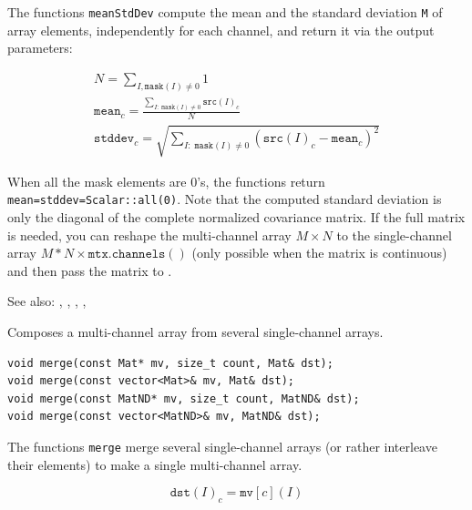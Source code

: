 The functions \texttt{meanStdDev} compute the mean and the standard deviation \texttt{M} of array elements, independently for each channel, and return it via the output parameters:

\[
\begin{array}{l}
N = \sum_{I, \texttt{mask}(I) \ne 0} 1\\
\texttt{mean}_c = \frac{\sum_{ I: \; \texttt{mask}(I) \ne 0} \texttt{src}(I)_c}{N}\\
\texttt{stddev}_c = \sqrt{\sum_{ I: \; \texttt{mask}(I) \ne 0} \left(\texttt{src}(I)_c - \texttt{mean}_c\right)^2}
\end{array}
\]

When all the mask elements are 0's, the functions return \texttt{mean=stddev=Scalar::all(0)}.
Note that the computed standard deviation is only the diagonal of the complete normalized covariance matrix. If the full matrix is needed, you can reshape the multi-channel array $M \times N$ to the single-channel array $M*N \times \texttt{mtx.channels}()$ (only possible when the matrix is continuous) and then pass the matrix to .

See also: , , , , 


\label{merge}
Composes a multi-channel array from several single-channel arrays.

\begin{lstlisting}
void merge(const Mat* mv, size_t count, Mat& dst);
void merge(const vector<Mat>& mv, Mat& dst);
void merge(const MatND* mv, size_t count, MatND& dst);
void merge(const vector<MatND>& mv, MatND& dst);
\end{lstlisting}
\begin{description}
\end{description}
    
The functions \texttt{merge} merge several single-channel arrays (or rather interleave their elements) to make a single multi-channel array.

\[\texttt{dst}(I)_c = \texttt{mv}[c](I)\]

